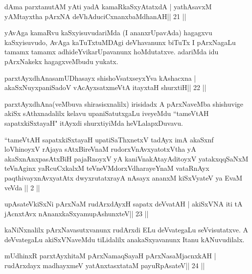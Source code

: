 \begin{shl}
dAma parxtanutAM yAti yadA kamaRkaSxyAtatxdA |
yathAsavxM yAMtayxtha pArxNA deVhAduciCxnanxbaMdhanAH\hfill || 21 ||
\end{shl}

\begin{artha}
yAvAga kamaRvu kaSxyisuvudariMda (I ananxrUpavAda) hagagxvu kaSxyisuvudo, AvAga kaTuTxtuMDAgi deVhavanunx biTuTx I pArxNagaLu tamamx tamamx adhideYvikarUpavanunx hoMdutatxve. adariMda idu pArxNakekx hagagxveMbudu yukatx.
\end{artha}

\begin{shl}
parxtAyxdhAnasamUDhasayx shishoVsatxseyxYva kAshacxna |
akaSxNuyxpaniSadoV vAcAyxsatxmeVtA itayxtaH shurxtiH\hfill || 22 ||
\end{shl}

\begin{artha}
parxtAyxdhAna(veMbuva shirasisxnalilx) irisidadx A pArxNaveMba shishuvige akiSx sAthxnadalilx kelavu upaniSatutxgaLu iveyeMdu ``tameVtAH sapatxkiSxtayaH" itAyxdi shurxtiyiMda heVLalapxDuvavu.
\end{artha}


{}

\begin{kandikeshl}
``tameVtAH sapatxkiSxtayaH upatiSaThxnetxV tadAyx imA akaSxnf
  loVhinoyxV rAjaya sAtxBireVnaM rudorxV\s nAvxyatotxV\s tha yA
  akaSxnAnxpasAtxBiH pajaRnoyxV yA kaniVnakAtayA\s ditoyxV
  yatakxqqSaNxM teVnAginx yaRcuCxkalxM teVneVMdorxV\s dharayeYnaM
  vataRnAyx paqthivayxnAvxyatAtx dwyxrutatxrayA nAsayx ananxM
  kiSxVyateV ya EvaM veVda || 2 || 
\end{kandikeshl}


\begin{shl}
upAsateV\s kiSxNi pArxNaM rudArxdAyxH sapatx deVvatAH |
akiSxVNA iti tA jAcnxtAvx nAnanxkaSxyamupAshunxteV\hfill || 23 ||
\end{shl}

\begin{artha}
kaNiNxnalilx pArxNavasutxvanunx rudArxdi ELu deVvategaLu seVvisutatxve. A deVvategaLu akiSxVNaveMdu tiLidalilx anakaSxyavanunx Itanu kANuvudilalx.
\end{artha}

\begin{shl}
mUdhinxR parxtAyxhitaM pArxNamaqSayaH pArxNasaMjacnxkAH |
rudArxdayx madhayxmeV yatAnxtasxtataM payuRpAsateV\hfill || 24 ||
\end{shl}

